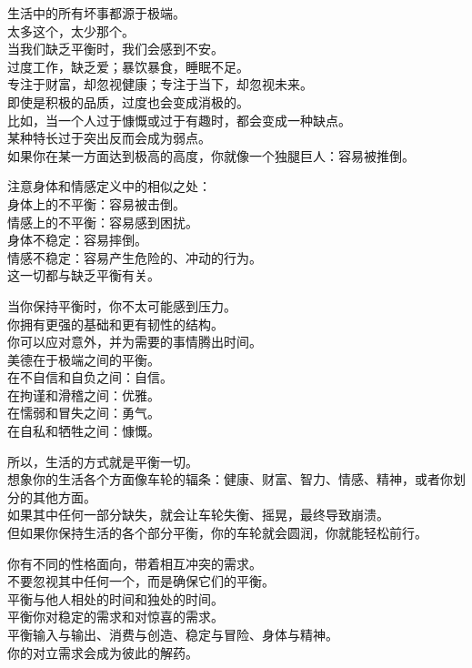 \documentclass[
]{article}
\begin{document}
生活中的所有坏事都源于极端。\\
太多这个，太少那个。\\
当我们缺乏平衡时，我们会感到不安。\\
过度工作，缺乏爱；暴饮暴食，睡眠不足。\\
专注于财富，却忽视健康；专注于当下，却忽视未来。\\
即使是积极的品质，过度也会变成消极的。\\
比如，当一个人过于慷慨或过于有趣时，都会变成一种缺点。\\
某种特长过于突出反而会成为弱点。\\
如果你在某一方面达到极高的高度，你就像一个独腿巨人：容易被推倒。

注意身体和情感定义中的相似之处：\\
身体上的不平衡：容易被击倒。\\
情感上的不平衡：容易感到困扰。\\
身体不稳定：容易摔倒。\\
情感不稳定：容易产生危险的、冲动的行为。\\
这一切都与缺乏平衡有关。

当你保持平衡时，你不太可能感到压力。\\
你拥有更强的基础和更有韧性的结构。\\
你可以应对意外，并为需要的事情腾出时间。\\
美德在于极端之间的平衡。\\
在不自信和自负之间：自信。\\
在拘谨和滑稽之间：优雅。\\
在懦弱和冒失之间：勇气。\\
在自私和牺牲之间：慷慨。

所以，生活的方式就是平衡一切。\\
想象你的生活各个方面像车轮的辐条：健康、财富、智力、情感、精神，或者你划分的其他方面。\\
如果其中任何一部分缺失，就会让车轮失衡、摇晃，最终导致崩溃。\\
但如果你保持生活的各个部分平衡，你的车轮就会圆润，你就能轻松前行。

你有不同的性格面向，带着相互冲突的需求。\\
不要忽视其中任何一个，而是确保它们的平衡。\\
平衡与他人相处的时间和独处的时间。\\
平衡你对稳定的需求和对惊喜的需求。\\
平衡输入与输出、消费与创造、稳定与冒险、身体与精神。\\
你的对立需求会成为彼此的解药。
\end{document}
